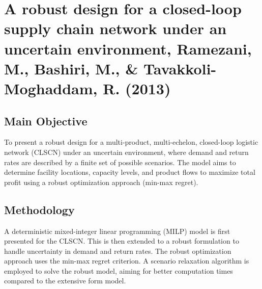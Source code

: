 \section{{A robust design for a closed-loop supply chain network under an uncertain environment, Ramezani, M., Bashiri, M., \& Tavakkoli-Moghaddam, R. (2013)}}

\subsection*{Main Objective}
To present a robust design for a multi-product, multi-echelon, closed-loop logistic network (CLSCN) under an uncertain environment, where demand and return rates are described by a finite set of possible scenarios. The model aims to determine facility locations, capacity levels, and product flows to maximize total profit using a robust optimization approach (min-max regret).

\subsection*{Methodology}
A deterministic mixed-integer linear programming (MILP) model is first presented for the CLSCN. This is then extended to a robust formulation to handle uncertainty in demand and return rates. The robust optimization approach uses the min-max regret criterion. A scenario relaxation algorithm is employed to solve the robust model, aiming for better computation times compared to the extensive form model.

